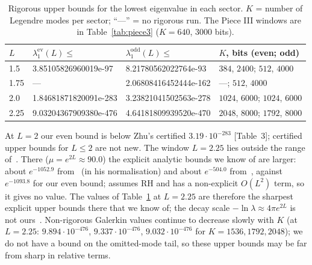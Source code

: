 \documentclass[11pt]{amsart}
\newcommand{\ev}{\mathrm{ev}}
\newcommand{\od}{\mathrm{odd}}
\newcommand{\e}[1]{\cdot 10^{#1}}
\theoremstyle{definition}
\theoremstyle{remark}
\numberwithin{equation}{section}
\begin{document}
\begin{table}[ht]
\centering\footnotesize
\caption{Rigorous upper bounds for the lowest eigenvalue in each sector. $K$ = number of Legendre modes per sector; ``---'' = no rigorous run. The Piece III windows are in Table~\ref{tab:piece3} ($K=640$, $3000$ bits).}\label{tab:upper}
\begin{tabular}{llll}
\toprule
$L$ & $\lambda_1^\ev(L)\le$ & $\lambda_1^\od(L)\le$ & $K$, bits (even; odd)\\
\midrule
1.5 & 3.85105826960019e-97 & 8.21780562022764e-93 & $384$, $2400$; $512$, $4000$\\
1.75 & --- & 2.06808416452444e-162 & ---; $512$, $4000$\\
2.0 & 1.84681871820091e-283 & 3.23821041502563e-278 & $1024$, $6000$; $1024$, $6000$\\
2.25 & 9.03204367909380e-476 & 4.64181809939520e-470 & $2048$, $8000$; $1792$, $8000$\\
\bottomrule
\end{tabular}
\end{table}

At $L=2$ our even bound is below Zhu's certified $3.19\e{-283}$ [Table~3]; certified upper bounds for $L\le2$ are not new. The window $L=2.25$ lies outside the range of~\cite{Zhu}. There ($\mu=e^{2L}\approx90.0$) the explicit analytic bounds we know of are larger: about $e^{-1052.9}$ from~\cite[Thm.~K(a)]{MoriV} (in his normalisation) and about $e^{-504.0}$ from~\cite[Thm.~2.1]{rh25}, against $e^{-1093.8}$ for our even bound; \cite[Thm.~1]{rh81} assumes RH and has a non-explicit $O(L^2)$ term, so it gives no value. The values of Table~\ref{tab:upper} at $L=2.25$ are therefore the sharpest explicit upper bounds there that we know of; the decay scale $-\ln\lambda\approx4\pi e^{2L}$ is not ours~\cite{Connes26,MoriV,rh80,rh81}. Non-rigorous Galerkin values continue to decrease slowly with $K$ (at $L=2.25$: $9.894\e{-476}$, $9.337\e{-476}$, $9.032\e{-476}$ for $K=1536,1792,2048$); we do not have a bound on the omitted-mode tail, so these upper bounds may be far from sharp in relative terms.
\end{document}
